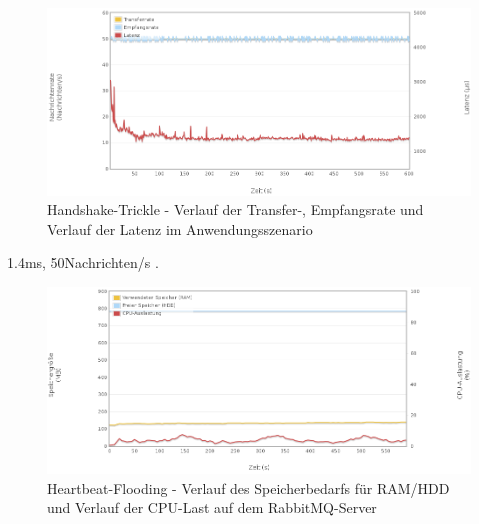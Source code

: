 \documentclass[	a4paper,
			11pt,
			oneside,
			parskip]{scrartcl}
\begin{document}
		\begin{figure}[!htb]
			\centering
			\includegraphics[width=\textwidth]{img/handshake/handshake_scenario.png}
			\caption{Handshake-Trickle - Verlauf der Transfer-, Empfangsrate und Verlauf der Latenz im Anwendungsszenario}
			\label{fig:handshake-scenario}
		\end{figure}
	
	
	\clearpage
		{%
		  \newline
		  \newline
		  \newline
		}{%
		 1.4ms, 50Nachrichten/s
		}{%
		. 
		}
		
		\begin{figure}[!htb]
			\centering
			\includegraphics[width=\textwidth]{img/heartbeat/heartbeat_server1.png}
			\caption{Heartbeat-Flooding - Verlauf des Speicherbedarfs für RAM/HDD und Verlauf der CPU-Last auf dem RabbitMQ-Server}
			\label{fig:heartbeat-server1}
		\end{figure}
		
\end{document}
